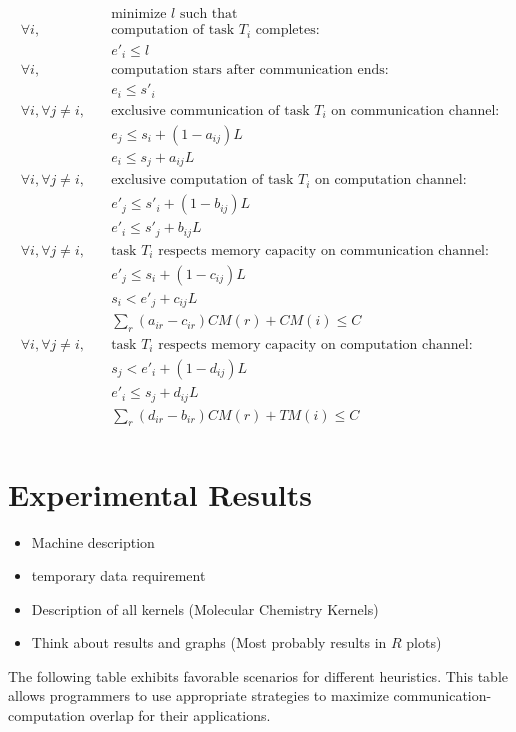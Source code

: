 \documentclass[runningheads]{llncs} %
\begin{document}
\vspace*{-0.5cm}
\begin{align*}
& \text{minimize } l \text{ such that }\\
\forall i, \quad & \text{computation of task } T_i \text{ completes:}\\
& e'_i \leq l\\
\forall i, \quad & \text{computation stars after communication ends:}\\
& e_i \leq s'_i\\
\forall i, \forall j\ne i, \quad & \text{exclusive communication of task }T_i \text{ on communication channel:}\\
& e_j \leq s_i +(1-a_{ij})L\\
& e_i\leq s_j +a_{ij}L\\
\forall i, \forall j\ne i, \quad & \text{exclusive computation of task }T_i \text{ on computation channel:}\\
& e'_j \leq s'_i +(1-b_{ij})L\\
& e'_i\leq s'_j +b_{ij}L\\
\forall i, \forall j\ne i, \quad & \text{task }T_i \text{ respects memory capacity on communication channel:}\\
& e'_j \leq s_i +(1-c_{ij})L\\
& s_i< e'_j +c_{ij}L\\
& \sum_r (a_{ir} - c_{ir})CM(r) + CM(i) \le C\\
\forall i, \forall j\ne i, \quad & \text{task }T_i \text{ respects memory capacity on computation channel:}\\
& s_j < e'_i +(1-d_{ij})L\\
& e'_i\leq s_j +d_{ij}L\\
& \sum_r (d_{ir} - b_{ir})CM(r) + TM(i) \le C\\
\end{align*} 

	\section{Experimental Results}
	\label{sec:exp}
	
	
	\begin{itemize}
		\item Machine description
		\item temporary data requirement
		\item Description of all kernels (Molecular Chemistry Kernels)
		\item Think about results and graphs (Most probably results in $R$ plots)
	\end{itemize}
\newpage
The following table exhibits favorable scenarios for different heuristics. This table allows programmers to use appropriate strategies to maximize communication-computation overlap for their applications.
\end{document}

